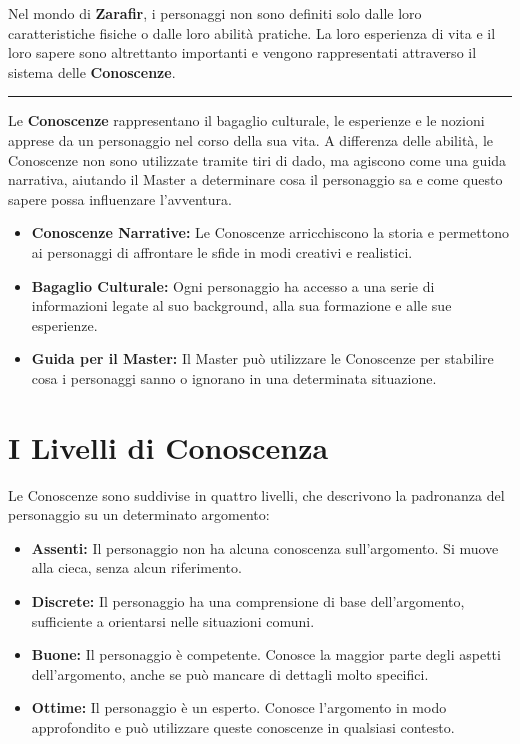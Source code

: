 \documentclass[../manuale_main.tex]{subfiles}
\begin{document}
Nel mondo di \textbf{Zarafir}, i personaggi non sono definiti solo dalle loro caratteristiche fisiche o dalle loro abilità pratiche. La loro esperienza di vita e il loro sapere sono altrettanto importanti e vengono rappresentati attraverso il sistema delle \textbf{Conoscenze}. 


\vspace{0.5cm}
\noindent
\begin{center}
\rule{\textwidth}{0.4pt} 
\end{center}
\vspace{0.5cm}

Le \textbf{Conoscenze} rappresentano il bagaglio culturale, le esperienze e le nozioni apprese da un personaggio nel corso della sua vita. A differenza delle abilità, le Conoscenze non sono utilizzate tramite tiri di dado, ma agiscono come una guida narrativa, aiutando il Master a determinare cosa il personaggio sa e come questo sapere possa influenzare l'avventura.

\begin{itemize}
    \item \textbf{Conoscenze Narrative:} Le Conoscenze arricchiscono la storia e permettono ai personaggi di affrontare le sfide in modi creativi e realistici.
    \item \textbf{Bagaglio Culturale:} Ogni personaggio ha accesso a una serie di informazioni legate al suo background, alla sua formazione e alle sue esperienze.
    \item \textbf{Guida per il Master:} Il Master può utilizzare le Conoscenze per stabilire cosa i personaggi sanno o ignorano in una determinata situazione.
\end{itemize}

\vspace{0.3cm}

\section*{I Livelli di Conoscenza}
Le Conoscenze sono suddivise in quattro livelli, che descrivono la padronanza del personaggio su un determinato argomento:

\begin{itemize}
    \item \textbf{Assenti:} Il personaggio non ha alcuna conoscenza sull’argomento. Si muove alla cieca, senza alcun riferimento.
    
    \item \textbf{Discrete:} Il personaggio ha una comprensione di base dell’argomento, sufficiente a orientarsi nelle situazioni comuni.
    
    \item \textbf{Buone:} Il personaggio è competente. Conosce la maggior parte degli aspetti dell’argomento, anche se può mancare di dettagli molto specifici.
    
    \item \textbf{Ottime:} Il personaggio è un esperto. Conosce l’argomento in modo approfondito e può utilizzare queste conoscenze in qualsiasi contesto.
\end{itemize}
\end{document}
